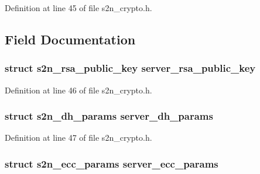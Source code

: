 Definition at line 45 of file s2n\+\_\+crypto.\+h.



\subsection{Field Documentation}
\subsubsection[{\texorpdfstring{server\+\_\+rsa\+\_\+public\+\_\+key}{server_rsa_public_key}}]{\setlength{\rightskip}{0pt plus 5cm}struct {\bf s2n\+\_\+rsa\+\_\+public\+\_\+key} server\+\_\+rsa\+\_\+public\+\_\+key}\hypertarget{structs2n__crypto__parameters_ac66524c1ba7864aa76ef5774384e7579}{}\label{structs2n__crypto__parameters_ac66524c1ba7864aa76ef5774384e7579}


Definition at line 46 of file s2n\+\_\+crypto.\+h.

\subsubsection[{\texorpdfstring{server\+\_\+dh\+\_\+params}{server_dh_params}}]{\setlength{\rightskip}{0pt plus 5cm}struct {\bf s2n\+\_\+dh\+\_\+params} server\+\_\+dh\+\_\+params}\hypertarget{structs2n__crypto__parameters_a3fee486205118888513b6ff2bdd5fb10}{}\label{structs2n__crypto__parameters_a3fee486205118888513b6ff2bdd5fb10}


Definition at line 47 of file s2n\+\_\+crypto.\+h.

\subsubsection[{\texorpdfstring{server\+\_\+ecc\+\_\+params}{server_ecc_params}}]{\setlength{\rightskip}{0pt plus 5cm}struct {\bf s2n\+\_\+ecc\+\_\+params} server\+\_\+ecc\+\_\+params}\hypertarget{structs2n__crypto__parameters_a1a6eac074b87a6fa3440ed9d4724d07d}{}\label{structs2n__crypto__parameters_a1a6eac074b87a6fa3440ed9d4724d07d}


